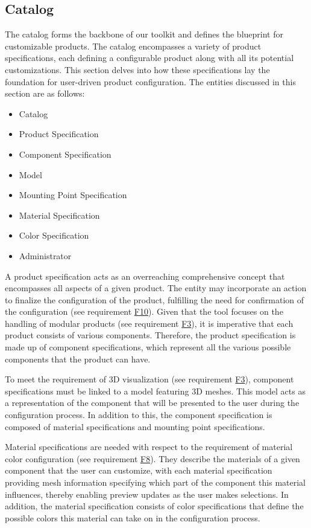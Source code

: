 \subsection{Catalog}

The catalog forms the backbone of our toolkit and defines the blueprint for customizable products. The catalog encompasses a variety of product specifications, each defining a configurable product along with all its potential customizations. This section delves into how these specifications lay the foundation for user-driven product configuration.
The entities discussed in this section are as follows:
\begin{itemize}
    \item Catalog
    \item Product Specification
    \item Component Specification
    \item Model
    \item Mounting Point Specification
    \item Material Specification
    \item Color Specification
    \item Administrator
\end{itemize}

A product specification acts as an overreaching comprehensive concept that encompasses all aspects of a given product. The entity may incorporate an action to finalize the configuration of the product, fulfilling the need for confirmation of the configuration (see requirement \hyperref[itm:F10]{F10}). Given that the tool focuses on the handling of modular products (see requirement \hyperref[itm:F3]{F3}), it is imperative that each product consists of various components. Therefore, the product specification is made up of component specifications, which represent all the various possible components that the product can have.

To meet the requirement of 3D visualization (see requirement \hyperref[itm:F3]{F3}), component specifications must be linked to a model featuring 3D meshes. This model acts as a representation of the component that will be presented to the user during the configuration process. In addition to this, the component specification is composed of material specifications and mounting point specifications.

Material specifications are needed with respect to the requirement of material color configuration (see requirement \hyperref[itm:F8]{F8}). They describe the materials of a given component that the user can customize, with each material specification providing mesh information specifying which part of the component this material influences, thereby enabling preview updates as the user makes selections. In addition, the material specification consists of color specifications that define the possible colors this material can take on in the configuration process.


